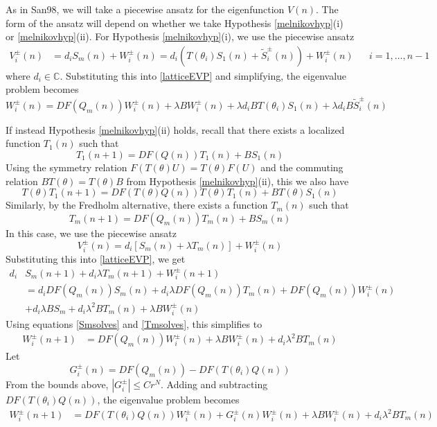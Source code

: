 \documentclass[12pt]{article}
\def\C{{\mathbb C}}
\begin{document}
As in San98, we will take a piecewise ansatz for the eigenfunction $V(n)$. The form of the ansatz will depend on whether we take Hypothesis \ref{melnikovhyp}(i) or \ref{melnikovhyp}(ii). For Hypothesis \ref{melnikovhyp}(i), we use the piecewise ansatz
\begin{align*}
V_i^\pm(n) &= d_i S_m(n) + W_i^\pm(n) = d_i ( T(\theta_i) S_1(n) + \tilde{S}_i^\pm(n) ) + W_i^\pm(n)
&& i = 1, \dots, n-1
\end{align*}
where $d_i \in \C$. Substituting this into \eqref{latticeEVP} and simplifying, the eigenvalue problem becomes
\begin{equation}\label{EVPhypi}
W_i^\pm(n) = DF(Q_m(n)) W_i^\pm(n) + \lambda B W_i^\pm(n) + \lambda d_i B T(\theta_i) S_1(n) + \lambda d_i B \tilde{S}_i^\pm(n)
\end{equation}

If instead Hypothesis \ref{melnikovhyp}(ii) holds, recall that there exists a localized function $T_1(n)$ such that 
\begin{equation}\label{T1vareq}
T_1(n+1) = DF(Q(n)) T_1(n) + B S_1(n)
\end{equation}
Using the symmetry relation $F(T(\theta)U) = T(\theta)F(U)$ and the commuting relation $B T(\theta) = T(\theta)B$ from Hypothesis \ref{melnikovhyp}(ii), this we also have
\begin{equation}\label{TthetaT1vareq}
T(\theta)T_1(n+1) = DF(T(\theta)Q(n)) T(\theta)T_1(n) + B T(\theta) S_1(n)
\end{equation}
Similarly, by the Fredholm alternative, there exists a function $T_m(n)$ such that 
\begin{equation}\label{Tmsolves}
T_m(n+1) = DF(Q_m(n)) T_m(n) + B S_m(n)
\end{equation}
In this case, we use the piecewise ansatz
\begin{equation}\label{Viansatz2}
V_i^\pm(n) = 
d_i [ S_m(n) + \lambda T_m(n) ] + W_i^\pm(n)
\end{equation}
Substituting this into \eqref{latticeEVP}, we get
\begin{align*}
d_i &S_m(n+1) + d_i \lambda T_m(n+1) + W_i^\pm(n+1) \\
&= d_i DF(Q_m(n)) S_m(n) + d_i \lambda DF(Q_m(n)) T_m(n) + DF(Q_m(n)) W_i^\pm(n) \\
&+ d_i \lambda B S_m + d_i \lambda^2 B T_m(n) + \lambda B W_i^\pm(n)
\end{align*}
Using equations \eqref{Smsolves} and \eqref{Tmsolves}, this simplifies to
\begin{align*}
W_i^\pm(n+1)
&= DF(Q_m(n)) W_i^\pm(n) + \lambda B W_i^\pm(n) + d_i \lambda^2 B T_m(n)
\end{align*}
Let
\begin{equation}
G_i^\pm(n) = DF(Q_m(n)) - DF(T(\theta_i) Q(n) )
\end{equation}
From the bounds above, $|G_i^\pm| \leq C r^N$. Adding and subtracting $DF(T(\theta_i) Q(n) )$, the eigenvalue problem becomes
\begin{align}\label{Weq1}
W_i^\pm(n+1)
&= DF(T(\theta_i) Q(n) ) W_i^\pm(n) + G_i^\pm(n)W_i^\pm(n) + \lambda B W_i^\pm(n) + d_i \lambda^2 B T_m(n)
\end{align}
\end{document}
